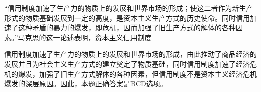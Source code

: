 \question ``信用制度加速了生产力的物质上的发展和世界市场的形成；使这二者作为新生产形式的物质基础发展到一定的高度，是资本主义生产方式的历史使命。同时信用加速了这种矛盾的暴力的爆发，即危机，因而加强了旧生产方式的解体的各种因素。''马克思的这一论述表明，资本主义信用制度
\par{}
\begin{solution}信用制度加速了生产力的物质上的发展和世界市场的形成，由此推动了商品经济的发展并且为社会主义生产方式的建立奠定了物质基础，同时信用制度加速了经济危机的爆发，加强了旧生产方式解体的各种因素，但信用制度不是资本主义经济危机爆发的深层原因。因此，本题正确答案是BCD选项。
\end{solution}

